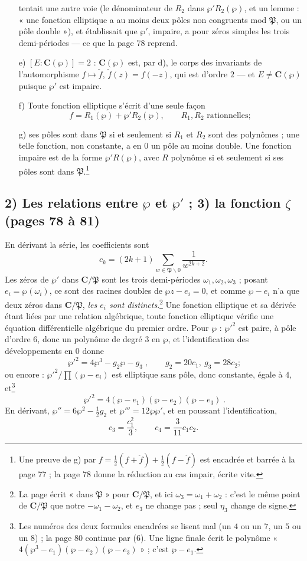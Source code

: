 \documentclass[11pt,a4paper]{article}
\begin{document}
\begin{itemize}
{tentait une autre voie (le dénominateur de $R_2$ dans $\wp'R_2(\wp)$, et un
lemme : « une fonction elliptique a au moins deux pôles non congruents mod
$\mathfrak{P}$, ou un pôle double »), et établissait que $\wp'$, impaire, a
pour zéros simples les trois demi-périodes --- ce que la page 78 reprend.}
\item[e)] $[E : \mathbf{C}(\wp)] = 2$ : $\mathbf{C}(\wp)$ est, par d), le corps
des invariants de l'automorphisme $f \mapsto \check f$, $\check f(z) = f(-z)$,
qui est d'ordre $2$ --- et $E \neq \mathbf{C}(\wp)$ puisque $\wp'$ est impaire.
\item[f)] Toute fonction elliptique s'écrit d'une seule façon
\[
f = R_1(\wp) + \wp' R_2(\wp), \qquad R_1, R_2 \text{ rationnelles} ;
\]
\item[g)] ses pôles sont dans $\mathfrak{P}$ si et seulement si $R_1$ et $R_2$
sont des polynômes ; une telle fonction, non constante, a en $0$ un pôle au
moins double. Une fonction impaire est de la forme $\wp' R(\wp)$, avec $R$
polynôme si et seulement si ses pôles sont dans $\mathfrak{P}$.\footnote{Une
preuve de g) par $f = \frac12(f + \check f) + \frac12(f - \check f)$ est
encadrée et barrée à la page 77 ; la page 78 donne la réduction au cas impair,
écrite vite.}
\end{itemize}

\subsection*{2) Les relations entre $\wp$ et $\wp'$ ; 3) la fonction $\zeta$ (pages 78 à 81)}

En dérivant la
série, les coefficients sont
\[
c_k = (2k+1)\sum_{w \in \mathfrak{P}\smallsetminus 0}\frac{1}{w^{2k+2}} .
\]
Les zéros de $\wp'$ dans $\mathbf{C}/\mathfrak{P}$ sont les trois demi-périodes
$\omega_1, \omega_2, \omega_3$ ; posant $e_i = \wp(\omega_i)$, ce sont des
racines doubles de $\wp z - e_i = 0$, et comme $\wp - e_i$ n'a que deux zéros
dans $\mathbf{C}/\mathfrak{P}$, \emph{les $e_i$ sont distincts}.\footnote{La page
écrit « dans $\mathfrak{P}$ » pour $\mathbf{C}/\mathfrak{P}$, et ici $\omega_3 =
\omega_1 + \omega_2$ : c'est le même point de $\mathbf{C}/\mathfrak{P}$ que
notre $-\omega_1 - \omega_2$, et $e_3$ ne change pas ; seul $\eta_3$ change de
signe.} Une fonction elliptique et sa dérivée étant liées par une relation
algébrique, toute fonction elliptique vérifie une équation différentielle
algébrique du premier ordre. Pour $\wp$ : $\wp'^2$ est paire, à pôle d'ordre $6$,
donc un polynôme de degré $3$ en $\wp$, et l'identification des développements
en $0$ donne
\[
\boxed{\;\wp'^2 = 4\wp^3 - g_2\wp - g_3\;}, \qquad g_2 = 20c_1,\ g_3 = 28c_2 ;
\]
ou encore : $\wp'^2/\prod(\wp - e_i)$ est elliptique sans pôle, donc constante,
égale à $4$, et\footnote{Les numéros des deux formules encadrées se lisent mal (un $4$ ou un
$7$, un $5$ ou un $8$) ; la page 80 continue par (6). Une ligne finale écrit le
polynôme « $4(\wp^3 - e_1)(\wp - e_2)(\wp - e_3)$ » ; c'est $\wp - e_1$.}
\[
\boxed{\;\wp'^2 = 4(\wp - e_1)(\wp - e_2)(\wp - e_3)\;} .
\]
En
dérivant, $\wp'' = 6\wp^2 - \frac12 g_2$ et $\wp''' = 12\wp\wp'$, et en poussant
l'identification,
\[
c_3 = \frac{c_1^2}{3}, \qquad c_4 = \frac{3}{11}c_1c_2 .
\]
\end{document}
